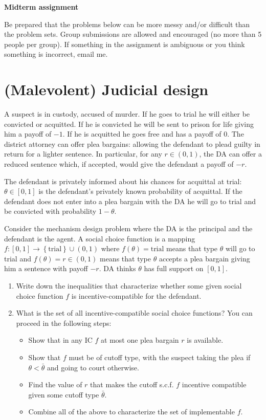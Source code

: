 \documentclass[a4paper]{article}
\begin{document}
	
	\begin{center}
		\LARGE\textbf{Midterm assignment}
	\end{center}
	
	
	Be prepared that the problems below can be more messy and/or difficult than the problem sets.
	Group submissions are allowed and encouraged (no more than 5 people per group). If something in the assignment is ambiguous or you think something is incorrect, email me.
	
	
	
	
	\section{(Malevolent) Judicial design}
	
	A suspect is in custody, accused of murder.  If he goes to trial he will either be convicted or acquitted. If he is convicted he will be sent to prison for life giving him a payoff of $-1$.  If he is acquitted he goes free and has a payoff of $0$.  The district attorney can offer plea bargains: allowing the defendant to plead guilty in return for a lighter sentence.  In particular, for any $r\in (0,1)$, the DA can offer a reduced sentence which, if accepted, would give the defendant a payoff of $-r.$
	
	The defendant is privately informed about his chances for acquittal at trial:  $\theta\in [0,1]$ is the defendant's privately known probability of acquittal.  If the defendant does not enter into a plea bargain with the DA he will go to trial and be convicted with probability $1 - \theta$.
	
	Consider the mechanism design problem where the DA is the principal and the defendant is the agent.  A social choice function is a mapping $f:[0,1] \rightarrow \left\{ \text{trial} \right\} \cup (0,1)$ where $f(\theta) = \text{trial}$ means that type $\theta$ will go to trial and $f(\theta) = r \in (0,1)$ means that type $\theta$ accepts a plea bargain giving him a sentence with payoff $-r$. DA thinks $\theta$ has full support on $[0,1]$.
	
	\begin{enumerate}
		\item Write down the inequalities that characterize whether some given social choice function $f$ is incentive-compatible	for the defendant.
		\item What is the set of all incentive-compatible social choice functions?
		You can proceed in the following steps:
		\begin{itemize}
			\item Show that in any IC $f$ at most one plea bargain $r$ is available.
			\item Show that $f$ must be of cutoff type, with the suspect taking the plea if $\theta < \bar{\theta}$ and going to court otherwise.
			\item Find the value of $r$ that makes the cutoff s.c.f. $f$ incentive compatible given some cutoff type $\bar{\theta}$.
			\item Combine all of the above to characterize the set of implementable $f$.
		\end{itemize}
	\end{enumerate}
	
\end{document}
